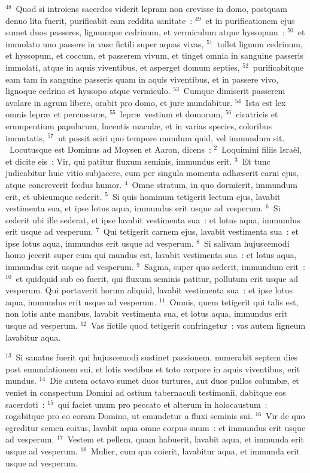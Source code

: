 ${}^{48}$~Quod si introiens sacerdos viderit lepram non crevisse in domo, postquam denuo lita fuerit, purificabit eam reddita sanitate~:
${}^{49}$~et in purificationem ejus sumet duos passeres, lignumque cedrinum, et vermiculum atque hyssopum~:
${}^{50}$~et immolato uno passere in vase fictili super aquas vivas,
${}^{51}$~tollet lignum cedrinum, et hyssopum, et coccum, et passerem vivum, et tinget omnia in sanguine passeris immolati, atque in aquis viventibus, et asperget domum septies,
${}^{52}$~purificabitque eam tam in sanguine passeris quam in aquis viventibus, et in passere vivo, lignoque cedrino et hyssopo atque vermiculo.
${}^{53}$~Cumque dimiserit passerem avolare in agrum libere, orabit pro domo, et jure mundabitur.
${}^{54}$~Ista est lex omnis lepr\ae\ et percussur\ae ,
${}^{55}$~lepr\ae\ vestium et domorum,
${}^{56}$~cicatricis et erumpentium papularum, lucentis macul\ae , et in varias species, coloribus immutatis,
${}^{57}$~ut possit sciri quo tempore mundum quid, vel immundum sit.
~Locutusque est Dominus ad Moysen et Aaron, dicens~:
${}^{2}$~Loquimini filiis Isra\"el, et dicite eis~: Vir, qui patitur fluxum seminis, immundus erit.
${}^{3}$~Et tunc judicabitur huic vitio subjacere, cum per singula momenta adh\ae serit carni ejus, atque concreverit fœdus humor.
${}^{4}$~Omne stratum, in quo dormierit, immundum erit, et ubicumque sederit.
${}^{5}$~Si quis hominum tetigerit lectum ejus, lavabit vestimenta sua, et ipse lotus aqua, immundus erit usque ad vesperum.
${}^{6}$~Si sederit ubi ille sederat, et ipse lavabit vestimenta sua~: et lotus aqua, immundus erit usque ad vesperum.
${}^{7}$~Qui tetigerit carnem ejus, lavabit vestimenta sua~: et ipse lotus aqua, immundus erit usque ad vesperum.
${}^{8}$~Si salivam hujuscemodi homo jecerit super eum qui mundus est, lavabit vestimenta sua~: et lotus aqua, immundus erit usque ad vesperum.
${}^{9}$~Sagma, super quo sederit, immundum erit~:
${}^{10}$~et quidquid sub eo fuerit, qui fluxum seminis patitur, pollutum erit usque ad vesperum. Qui portaverit horum aliquid, lavabit vestimenta sua~: et ipse lotus aqua, immundus erit usque ad vesperum.
${}^{11}$~Omnis, quem tetigerit qui talis est, non lotis ante manibus, lavabit vestimenta sua, et lotus aqua, immundus erit usque ad vesperum.
${}^{12}$~Vas fictile quod tetigerit confringetur~: vas autem ligneum lavabitur aqua.


${}^{13}$~Si sanatus fuerit qui hujuscemodi sustinet passionem, numerabit septem dies post emundationem sui, et lotis vestibus et toto corpore in aquis viventibus, erit mundus.
${}^{14}$~Die autem octavo sumet duos turtures, aut duos pullos columb\ae , et veniet in conspectum Domini ad ostium tabernaculi testimonii, dabitque eos sacerdoti~:
${}^{15}$~qui faciet unum pro peccato et alterum in holocaustum~: rogabitque pro eo coram Domino, ut emundetur a fluxi seminis sui.
${}^{16}$~Vir de quo egreditur semen coitus, lavabit aqua omne corpus suum~: et immundus erit usque ad vesperum.
${}^{17}$~Vestem et pellem, quam habuerit, lavabit aqua, et immunda erit usque ad vesperum.
${}^{18}$~Mulier, cum qua coierit, lavabitur aqua, et immunda erit usque ad vesperum.


